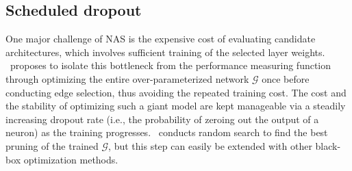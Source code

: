 \subsection{Scheduled dropout}
One major challenge of NAS is the expensive cost of evaluating candidate architectures, which involves sufficient training of the selected layer weights. \citet{bender2018understanding}~proposes to isolate this bottleneck from the performance measuring function through optimizing the entire over-parameterized network $\mathcal{G}$ once before conducting edge selection, thus avoiding the repeated training cost. The cost and the stability of optimizing such a giant model are kept manageable via a steadily increasing dropout rate (i.e., the probability of zeroing out the output of a neuron) as the training progresses. \citet{bender2018understanding}~conducts random search to find the best pruning of the trained $\mathcal{G}$, but this step can easily be extended with other black-box optimization methods.
